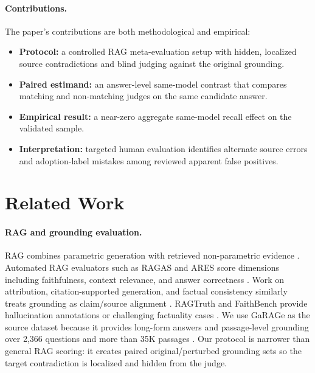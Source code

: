 \paragraph{Contributions.}
The paper's contributions are both methodological and empirical:
\begin{itemize}[leftmargin=*]
  \item \textbf{Protocol:} a controlled RAG meta-evaluation setup with hidden, localized source contradictions and blind judging against the original grounding.
  \item \textbf{Paired estimand:} an answer-level same-model contrast that compares matching and non-matching judges on the same candidate answer.
  \item \textbf{Empirical result:} a near-zero aggregate same-model recall effect on the validated sample.
  \item \textbf{Interpretation:} targeted human evaluation identifies alternate source errors and adoption-label mistakes among reviewed apparent false positives.
\end{itemize}

\section{Related Work}

\paragraph{RAG and grounding evaluation.}
RAG combines parametric generation with retrieved non-parametric evidence \citep{lewis2020rag}. Automated RAG evaluators such as RAGAS and ARES score dimensions including faithfulness, context relevance, and answer correctness \citep{es2023ragas,saadfalcon2023ares}. Work on attribution, citation-supported generation, and factual consistency similarly treats grounding as claim/source alignment \citep{rashkin2023attribution,gao2023alce,honovich2022true,min2023factscore}. RAGTruth and FaithBench provide hallucination annotations or challenging factuality cases \citep{niu2023ragtruth,bao2024faithbench}. We use GaRAGe as the source dataset because it provides long-form answers and passage-level grounding over 2,366 questions and more than 35K passages \citep{sorodoc2025garage}. Our protocol is narrower than general RAG scoring: it creates paired original/perturbed grounding sets so the target contradiction is localized and hidden from the judge.

